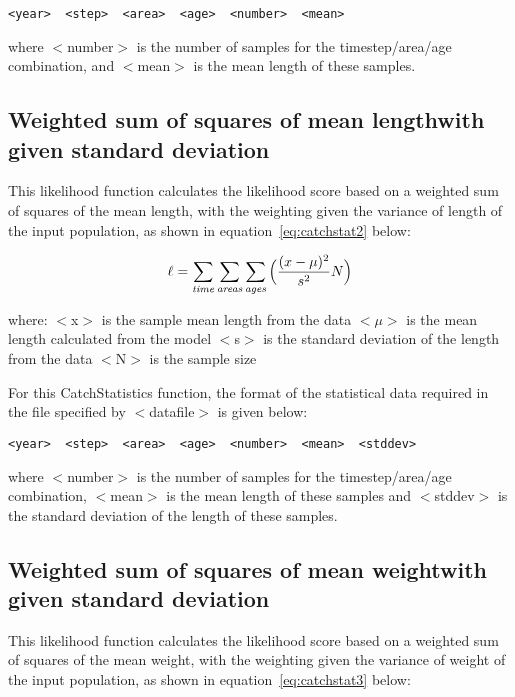 \documentclass [a4paper, 10pt]{book}
\begin{document}
\begin{verbatim}
<year>  <step>  <area>  <age>  <number>  <mean>
\end{verbatim}

where $<$number$>$ is the number of samples for the timestep/area/age combination, and $<$mean$>$ is the mean length of these samples.

\subsection{Weighted sum of squares of mean length\newline with given standard deviation}
This likelihood function calculates the likelihood score based on a weighted sum of squares of the mean length, with the weighting given the variance of length of the input population, as shown in  equation~\ref{eq:catchstat2} below:

\begin{equation}\label{eq:catchstat2}
\ell = \sum_{\it time}\sum_{\it areas}\sum_{\it ages} \Big(\frac{(x-\mu)^2} {s^2} N\Big)
\end{equation}

where:\newline
$<$x$>$ is the sample mean length from the data\newline
$<$$\mu$$>$ is the mean length calculated from the model\newline
$<$s$>$ is the standard deviation of the length from the data\newline
$<$N$>$ is the sample size

\bigskip
For this CatchStatistics function, the format of the statistical data required in the file specified by $<$datafile$>$ is given below:

\begin{verbatim}
<year>  <step>  <area>  <age>  <number>  <mean>  <stddev>
\end{verbatim}

where $<$number$>$ is the number of samples for the timestep/area/age combination, $<$mean$>$ is the mean length of these samples and $<$stddev$>$ is the standard deviation of the length of these samples.

\subsection{Weighted sum of squares of mean weight\newline with given standard deviation}
This likelihood function calculates the likelihood score based on a weighted sum of squares of the mean weight, with the weighting given the variance of weight of the input population, as shown in equation~\ref{eq:catchstat3} below:
\end{document}
